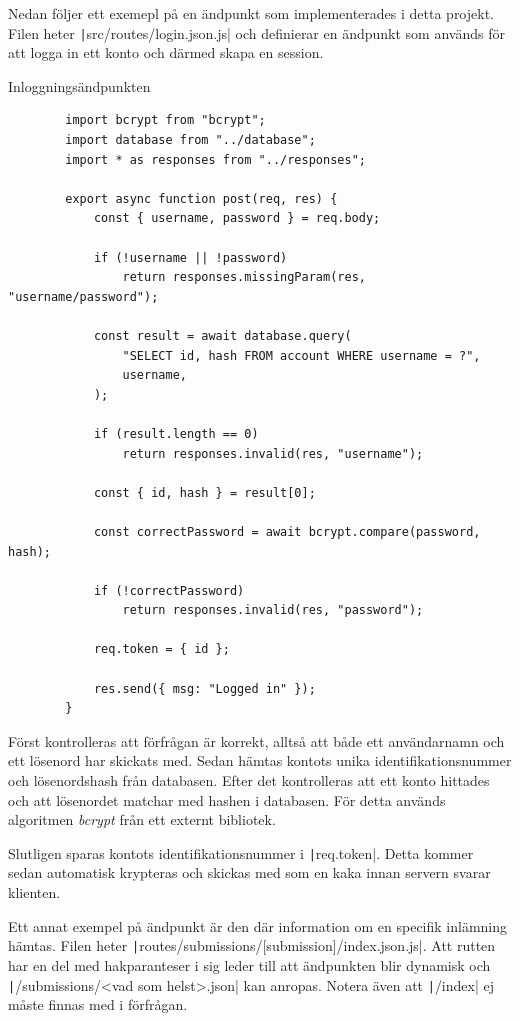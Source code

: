 \documentclass{article}
\begin{document}
Nedan följer ett exemepl på en ändpunkt som implementerades i detta projekt.
Filen heter \texttt|src/routes/login.json.js| och definierar en ändpunkt som
används för att logga in ett konto och därmed skapa en session.

\begin{listing}[H]
	\caption{Inloggningsändpunkten}
	\begin{verbatim}
		import bcrypt from "bcrypt";
		import database from "../database";
		import * as responses from "../responses";

		export async function post(req, res) {
			const { username, password } = req.body;

			if (!username || !password)
				return responses.missingParam(res, "username/password");

			const result = await database.query(
				"SELECT id, hash FROM account WHERE username = ?",
				username,
			);

			if (result.length == 0)
				return responses.invalid(res, "username");

			const { id, hash } = result[0];

			const correctPassword = await bcrypt.compare(password, hash);

			if (!correctPassword)
				return responses.invalid(res, "password");

			req.token = { id };

			res.send({ msg: "Logged in" });
		}
	\end{verbatim}
\end{listing}

Först kontrolleras att förfrågan är korrekt, alltså att både ett användarnamn
och ett lösenord har skickats med. Sedan hämtas kontots unika
identifikationsnummer och lösenordshash från databasen. Efter det kontrolleras
att ett konto hittades och att lösenordet matchar med hashen i databasen. För
detta används algoritmen \textit{bcrypt} från ett externt bibliotek.

Slutligen sparas kontots identifikationsnummer i
\texttt|req.token|. Detta
kommer sedan automatisk krypteras och skickas med som en kaka innan servern
svarar klienten.

Ett annat exempel på ändpunkt är den där information om en specifik inlämning
hämtas. Filen heter \texttt|routes/submissions/[submission]/index.json.js|. Att
rutten har en del med hakparanteser i sig leder till att ändpunkten blir
dynamisk och \texttt|/submissions/<vad som helst>.json| kan anropas. Notera även
att \texttt|/index| ej måste finnas med i förfrågan.
\end{document}
